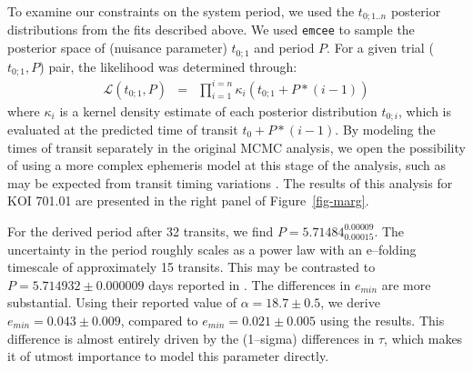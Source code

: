 To examine our constraints on the system period, we used the
$t_{0;1..n}$ posterior distributions from the fits described above.
We used {\tt emcee} to sample the posterior space of (nuisance
parameter) $t_{0;1}$ and period $P$.  For a given trial ($t_{0;1}, P$)
pair, the likelihood was determined through:
\begin{eqnarray}
\mathcal{L}(t_{0;1}, P) & = & \prod_{i=1}^{i=n} \kappa_i(t_{0;1} + P * (i-1))
\end{eqnarray}
where $\kappa_i$ is a kernel density estimate of each posterior
distribution $t_{0;i}$, which is evaluated at the predicted time of
transit $t_0 + P * (i-1)$.  By modeling the times of transit
separately in the original MCMC analysis, we open the possibility of
using a more complex ephemeris model at this stage of the analysis,
such as may be expected from transit timing variations
\citep{2005MNRAS.359..567A,2005Sci...307.1288H}.  The results of this
analysis for KOI 701.01 are presented in the right panel of
Figure~\ref{fig-marg}.

For the derived period after 32 transits, we find $P =
5.71484_{0.00015}^{0.00009}$.  The uncertainty in the period roughly
scales as a power law with an e--folding timescale of approximately 15
transits.  This may be contrasted to $P = 5.714932 \pm 0.000009$ days
reported in \cite{2013arXiv1304.7387B}.  The differences in $e_{min}$
are more substantial.  Using their reported value of $\alpha =
18.7 \pm 0.5$, we derive $e_{min} = 0.043 \pm 0.009$, compared to
$e_{min} = 0.021 \pm 0.005$ using the \cite{2013arXiv1304.7387B}
results.  This difference is almost entirely driven by the (1--sigma)
differences in $\tau$, which makes it of utmost importance to model
this parameter directly.


